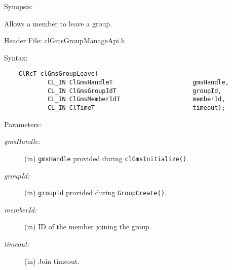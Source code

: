 \begin{flushleft}
\begin{Desc}
      \item[Synopsis:]

  Allows a member to leave a group.  \end{Desc}

      \begin{Desc}
        \item[Header File:]
        clGmsGroupManageApi.h\end{Desc}

        \begin{Desc}
        \item[Syntax:]
        \footnotesize\begin{verbatim}
    ClRcT clGmsGroupLeave(
            CL_IN ClGmsHandleT                      gmsHandle,
            CL_IN ClGmsGroupIdT                     groupId,
            CL_IN ClGmsMemberIdT                    memberId,
            CL_IN ClTimeT                           timeout);

       \end{verbatim}
        \normalsize
        \end{Desc}

       \begin{Desc}
      \item[Parameters:]
      \begin{description}
        \item[{\em gmsHandle:}] (in) {\tt{gmsHandle}} provided during {\tt{clGmsInitialize()}}.
       \item[{\em groupId:}] (in) {\tt{groupId}} provided during {\tt{GroupCreate()}}.
      \item[{\em memberId:}] (in) ID of the member joining the group.
      \item[{\em timeout:}] (in) Join timeout.

     \end{description}
       \end{Desc}


\end{flushleft}

